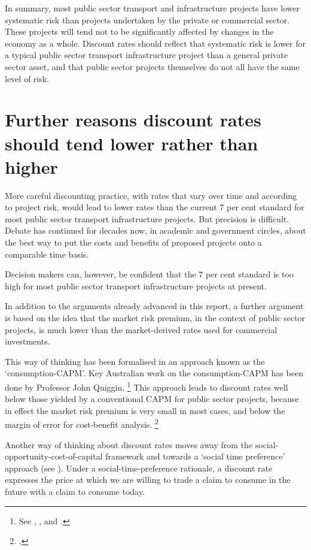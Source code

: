 \documentclass{grattan}
\begin{document}
In summary, most public sector transport and infrastructure projects have lower systematic risk than projects undertaken by the private or commercial sector. These projects will tend not to be significantly affected by changes in the economy as a whole. Discount rates should reflect that systematic risk is lower for a typical public sector transport infrastructure project than a general private sector asset, and that public sector projects themselves do not all have the same level of risk.


\section{Further reasons discount rates should tend lower rather than higher}\label{subsec:DRs-tend-lower}

More careful discounting practice, with rates that vary over time and according to project risk, would lead to lower rates than the current 7 per cent standard for most public sector transport infrastructure projects. But precision is difficult. Debate has continued for decades now, in academic and government circles, about the best way to put the costs and benefits of proposed projects onto a comparable time basis.

Decision makers can, however, be confident that the 7 per cent standard is too high for most public sector transport infrastructure projects at present.

In addition to the arguments already advanced in this report, a further argument is based on the idea that the market risk premium, in the context of public sector projects, is much lower than the market-derived rates used for commercial investments. 

This way of thinking has been formalised in an approach known as the `consumption-CAPM'. Key Australian work on the consumption-CAPM has been done by Professor John Quiggin.%
    \footnote{See \textcite{BITRE2005RiskinCostBenefitAnalysis}, \textcite{Quiggin-Grant-Equity-Risk-Premium}, and  \textcite{Gollier-Pricing-the-planets-future}.}
This approach leads to discount rates well below those yielded by a conventional CAPM for public sector projects, because in effect the market risk premium is very small in most cases, and below the margin of error for cost-benefit analysis.%
    \footcite[][11]{BITRE2005RiskinCostBenefitAnalysis}

Another way of thinking about discount rates moves away from the social-opportunity-cost-of-capital framework and towards a `social time preference' approach (see ). Under a social-time-preference rationale, a discount rate expresses the price at which we are willing to trade a claim to consume in the future with a claim to consume today. 
\end{document}
